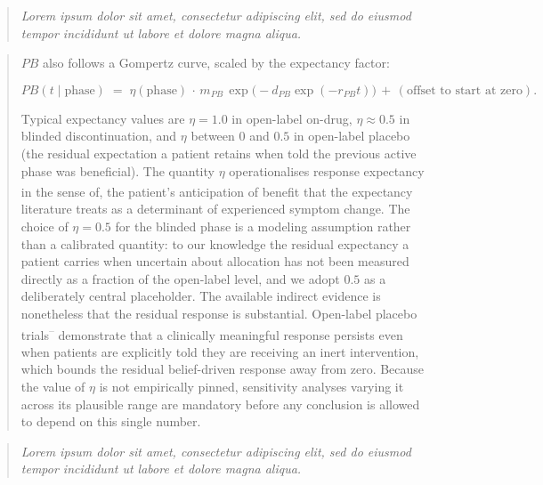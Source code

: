 \documentclass[
  11pt,
]{article}
\newcounter{none} %
\newenvironment{rgt}{%
  \begin{quote}\small\itshape\color[RGB]{20,60,160}}{%
  \end{quote}}
\newenvironment{orig}{%
  \begin{quote}\normalsize\color[gray]{0.55}}{%
  \end{quote}}
\begin{document}
\begin{rgt}
Lorem ipsum dolor sit amet, consectetur adipiscing elit, sed do eiusmod tempor incididunt ut labore et dolore magna aliqua.

\end{rgt}

\begin{orig}
\(PB\) also follows a Gompertz curve, scaled by the expectancy
factor:

\[
PB(t \mid \text{phase}) \;=\; \eta(\text{phase}) \,\cdot\,
m_{PB}\,\exp\bigl(-d_{PB}\exp(-r_{PB} t)\bigr)
\,+\, (\text{offset to start at zero}).
\]

Typical expectancy values are \(\eta = 1.0\) in open-label
on-drug, \(\eta \approx 0.5\) in blinded discontinuation, and
\(\eta\) between \(0\) and \(0.5\) in open-label placebo (the residual
expectation a patient retains when told the previous active
phase was beneficial). The quantity \(\eta\) operationalises
response expectancy in the sense of\textsuperscript{}, the patient's
anticipation of benefit that the expectancy literature treats as
a determinant of experienced symptom change. The choice of
\(\eta = 0.5\) for the blinded phase is a modeling assumption
rather than a calibrated quantity: to our knowledge the residual expectancy a patient
carries when uncertain about allocation has not been measured
directly as a fraction of the open-label level, and we adopt
\(0.5\) as a deliberately central placeholder. The available
indirect evidence is nonetheless that the residual response is
substantial. Open-label placebo trials\textsuperscript{--} demonstrate that a clinically
meaningful response persists even when patients are explicitly
told they are receiving an inert intervention, which bounds the
residual belief-driven response away from zero. Because the
value of \(\eta\) is not empirically pinned, sensitivity analyses
varying it across its plausible range are mandatory before any
conclusion is allowed to depend on this single number.

\end{orig}

\begin{rgt}
Lorem ipsum dolor sit amet, consectetur adipiscing elit, sed do eiusmod tempor incididunt ut labore et dolore magna aliqua.

\end{rgt}
\end{document}

